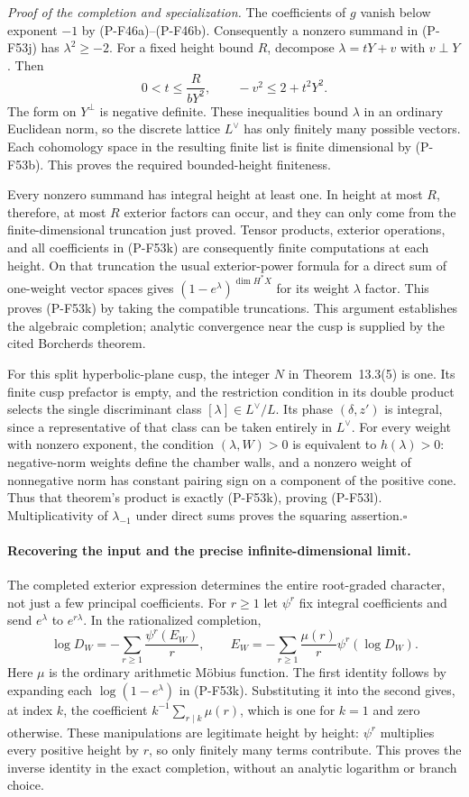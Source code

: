 \documentclass[11pt,a4paper]{article}
\begin{document}
\emph{Proof of the completion and specialization.}
The coefficients of $g$ vanish below exponent $-1$ by
(P-F46a)--(P-F46b). Consequently a nonzero summand in
(P-F53j) has $\lambda^2\ge-2$.
For a fixed height bound $R$, decompose
$\lambda=tY+v$ with $v\perp Y$. Then
\[
 0<t\le \frac{R}{bY^2},\qquad
       -v^2\le 2+t^2Y^2.
 \tag{P-F53m}
\]
The form on $Y^\perp$ is negative definite. These inequalities
bound $\lambda$ in an ordinary Euclidean norm, so the discrete
lattice $L^\vee$ has only finitely many possible vectors.
Each cohomology space in the resulting finite list is finite
dimensional by (P-F53b). This proves the required bounded-height
finiteness.

Every nonzero summand has integral height at least one.
In height at most $R$, therefore, at most $R$ exterior factors
can occur, and they can only come from the finite-dimensional
truncation just proved. Tensor products, exterior operations,
and all coefficients in (P-F53k) are consequently finite
computations at each height. On that truncation the usual
exterior-power formula for a direct sum of one-weight vector
spaces gives $(1-e^\lambda)^{\dim H^*X}$ for its weight
$\lambda$ factor. This proves (P-F53k) by taking the compatible
truncations. This argument establishes the algebraic completion;
analytic convergence near the cusp is supplied by the cited
Borcherds theorem.

For this split hyperbolic-plane cusp, the integer $N$ in
Theorem~13.3(5) is one. Its finite cusp prefactor is empty,
and the restriction condition in its double product selects
the single discriminant class $[\lambda]\in L^\vee/L$.
Its phase $(\delta,z')$ is integral, since a representative
of that class can be taken entirely in $L^\vee$.
For every weight with nonzero exponent, the condition
$(\lambda,W)>0$ is equivalent to $h(\lambda)>0$:
negative-norm weights define the chamber walls, and a
nonzero weight of nonnegative norm has constant pairing
sign on a component of the positive cone. Thus that
theorem's product is exactly (P-F53k), proving (P-F53l).
Multiplicativity of $\lambda_{-1}$ under direct sums proves
the squaring assertion.\hfill$\square$

\paragraph{Recovering the input and the precise infinite-dimensional limit.}
The completed exterior expression determines the entire
root-graded character, not just a few principal coefficients.
For $r\ge1$ let $\psi^r$ fix integral coefficients and send
$e^\lambda$ to $e^{r\lambda}$. In the rationalized completion,
\[
 \log D_W=-\sum_{r\ge1}\frac{\psi^r(E_W)}r,
 \qquad
 E_W=-\sum_{r\ge1}\frac{\mu(r)}r\psi^r(\log D_W).
 \tag{P-F53n}
\]
Here $\mu$ is the ordinary arithmetic M\"obius function.
The first identity follows by expanding each
$\log(1-e^\lambda)$ in (P-F53k). Substituting it into
the second gives, at index $k$, the coefficient
$k^{-1}\sum_{r\mid k}\mu(r)$, which is one for $k=1$
and zero otherwise. These manipulations are legitimate
height by height: $\psi^r$ multiplies every positive
height by $r$, so only finitely many terms contribute.
This proves the inverse identity in the exact completion,
without an analytic logarithm or branch choice.
\end{document}
